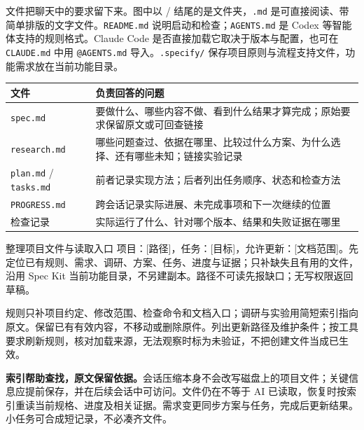 文件把聊天中的要求留下来。图中以 / 结尾的是文件夹，\texttt{.md} 是可直接阅读、带简单排版的文字文件。\texttt{README.md} 说明启动和检查；\texttt{AGENTS.md} 是 Codex 等智能体支持的规则格式。Claude Code 是否直接加载它取决于版本与配置，也可在 \texttt{CLAUDE.md} 中用 \texttt{@AGENTS.md} 导入。\texttt{.specify/} 保存项目原则与流程支持文件，功能需求放在当前功能目录。

\begin{tabularx}{\linewidth}{@{}L{38mm}Y@{}}
\toprule 文件 & 负责回答的问题\\\midrule
\texttt{spec.md} & 要做什么、哪些内容不做、看到什么结果才算完成；原始要求保留原文或可回查链接\\
\texttt{research.md} & 哪些问题查过、依据在哪里、比较过什么方案、为什么选择、还有哪些未知；链接实验记录\\
\texttt{plan.md} / \texttt{tasks.md} & 前者记录实现方法；后者列出任务顺序、状态和检查方法\\
\texttt{PROGRESS.md} & 跨会话记录实际进展、未完成事项和下一次继续的位置\\
检查记录 & 实际运行了什么、针对哪个版本、结果和失败证据在哪里\\
\bottomrule\end{tabularx}
\begin{prompt}{整理项目文件与读取入口}
项目：[路径]，任务：[目标]，允许更新：[文档范围]。先定位已有规则、需求、调研、方案、任务、进度与证据；只补缺失且有用的文件，沿用 Spec Kit 当前功能目录，不另建副本。路径不可读先报缺口；无写权限返回草稿。\par
规则只补项目约定、修改范围、检查命令和文档入口；调研与实验用简短索引指向原文。保留已有有效内容，不移动或删除原件。列出更新路径及维护条件；按工具要求刷新规则，核对加载来源，无法观察时标为未验证，不把创建文件当成已生效。
\end{prompt}
\textbf{索引帮助查找，原文保留依据。}会话压缩本身不会改写磁盘上的项目文件；关键信息应提前保存，并在后续会话中可访问。文件仍在不等于 AI 已读取，恢复时按索引重读当前规格、进度及相关证据。需求变更同步方案与任务，完成后更新结果。小任务可合成短记录，不必凑齐文件。
